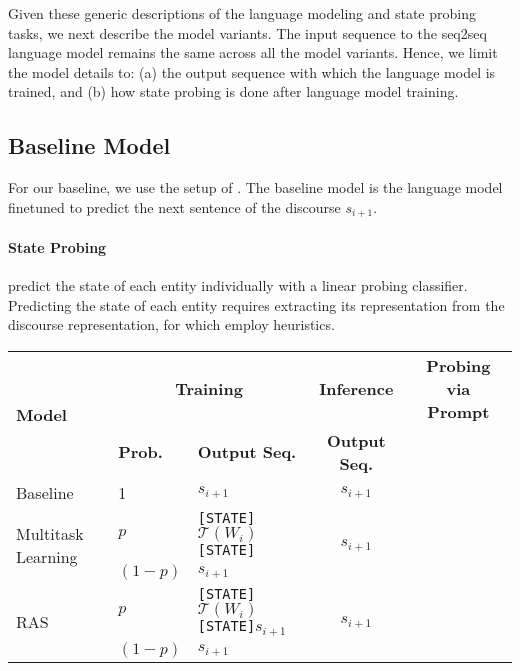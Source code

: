 \documentclass[12pt]{thesis-umich}[thesis]
\newcommand{\cmark}{\ding{51}}\newcommand{\xmark}{\ding{55}}
\newcommand{\state}[0]{\texttt{[STATE]}}
\begin{document}
Given these generic descriptions of the language modeling and state probing tasks, we next describe the model variants.
The input sequence to the seq2seq language model remains the same across all the model variants. Hence, we limit  the model details to: (a) the output sequence with which the language model is trained, and (b) how state probing is done after language model training.   



\subsection{Baseline Model}
For our baseline, we use the setup of \citet{li-etal-2021-implicit}. 
The baseline model is the language model finetuned to predict the next sentence of the discourse $s_{i+1}$.

\paragraph{State Probing} 
\citet{li-etal-2021-implicit} predict the state of each entity individually with a linear probing classifier. 
Predicting the state of each entity requires extracting its representation from the discourse representation, for which \citet{li-etal-2021-implicit} employ 
heuristics. 




\begin{table*}
    \centering
    \small{
          \renewcommand{\arraystretch}{1.1}
    \begin{tabular}{
    l|ll|c|c
    }
    \toprule
        \multirow{2}{*}{\textbf{Model}}  &  \multicolumn{2}{c}{\textbf{Training}} & \textbf{Inference} & \textbf{Probing via Prompt} \\
                 &  \textbf{Prob.} & \textbf{Output Seq.} & \textbf{Output Seq.} & \\\midrule 
        Baseline &  1 & $s_{i+1}$ & $s_{i+1}$ & \xmark\\
        \midrule
        \multirow{2}{*}{Multitask Learning} & $p$  & \state $\mathcal{T}(W_i)$ \state &   \multirow{2}{*}{$s_{i+1}$} & \multirow{2}{*}{\cmark}\\
        & $(1 - p)$  & $s_{i+1}$  &   \\
        \midrule
        \multirow{2}{*}{RAS} &  $p$ & 
        \state  $\mathcal{T}(W_i)$ \state  $s_{i+1}$ 
           &  \multirow{2}{*}{$s_{i+1}$} & \multirow{2}{*}{\cmark}\\
          & $(1 - p)$  & $s_{i+1}$ &   \\
        \bottomrule
        

    \end{tabular}
    }
    \caption{Summary of Output Sequences during Training and Inference for all the language model variants. $W_i$ denotes the world state at the end of the first $i$ sentences $s_{1:i}$ of the discourse. $\mathcal{T}(W_i)$ denotes the translation of world state to natural language text.  
    \state\ denotes the special token used to mark the state description boundary. }
    \label{tab:output_seq}
    \vspace{-0.1in}
\end{table*} 
\end{document}
